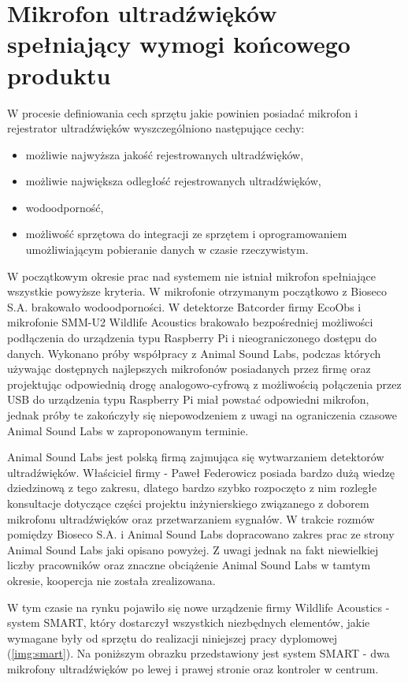 \documentclass{sprz}
\begin{document}
\section{Mikrofon ultradźwięków spełniający wymogi końcowego produktu}
W procesie definiowania cech sprzętu jakie powinien posiadać mikrofon i rejestrator ultradźwięków wyszczególniono następujące cechy:
  \begin{itemize}
    \item{możliwie najwyższa jakość rejestrowanych ultradźwięków,}
    \item{możliwie największa odległość rejestrowanych ultradźwięków,}
    \item{wodoodporność,}
    \item{możliwość sprzętowa do integracji ze sprzętem i oprogramowaniem umożliwiającym pobieranie danych w czasie rzeczywistym.}
  \end{itemize}

W początkowym okresie prac nad systemem nie istniał mikrofon spełniające wszystkie powyższe kryteria. W mikrofonie otrzymanym początkowo z Bioseco S.A. brakowało wodoodporności. W detektorze Batcorder firmy EcoObs i mikrofonie SMM-U2 Wildlife Acoustics brakowało bezpośredniej możliwości podłączenia do urządzenia typu Raspberry Pi i nieograniczonego dostępu do danych. Wykonano próby współpracy z Animal Sound Labs, podczas których używając dostępnych najlepszych mikrofonów posiadanych przez firmę oraz projektując odpowiednią drogę analogowo-cyfrową z możliwością połączenia przez USB do urządzenia typu Raspberry Pi miał powstać odpowiedni mikrofon, jednak próby te zakończyły się niepowodzeniem z uwagi na ograniczenia czasowe Animal Sound Labs w zaproponowanym terminie. 

Animal Sound Labs jest polską firmą zajmująca się wytwarzaniem detektorów ultradźwięków. Właściciel firmy - Paweł Federowicz posiada bardzo dużą wiedzę dziedzinową z tego zakresu, dlatego bardzo szybko rozpoczęto z nim rozległe konsultacje dotyczące części projektu inżynierskiego związanego z doborem mikrofonu ultradźwięków oraz przetwarzaniem sygnałów. W trakcie rozmów pomiędzy Bioseco S.A. i Animal Sound Labs dopracowano zakres prac ze strony Animal Sound Labs jaki opisano powyżej. Z uwagi jednak na fakt niewielkiej liczby pracowników oraz znaczne obciążenie Animal Sound Labs w tamtym okresie, koopercja nie została zrealizowana.

W tym czasie na rynku pojawiło się nowe urządzenie firmy Wildlife Acoustics - system SMART, który dostarczył wszystkich niezbędnych elementów, jakie wymagane były od sprzętu do realizacji niniejszej pracy dyplomowej (\ref{img:smart}). Na poniższym obrazku przedstawiony jest system SMART - dwa mikrofony ultradźwięków po lewej i prawej stronie oraz kontroler w centrum.
\end{document}
